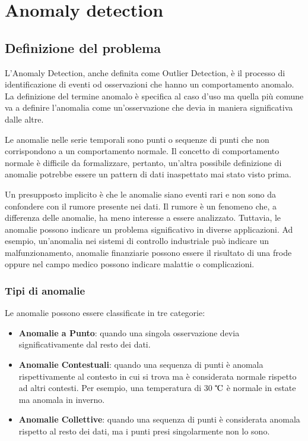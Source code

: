 \chapter{Anomaly detection}
\label{chap:intro}

\section{Definizione del problema}

L'Anomaly Detection, anche definita come Outlier Detection, è il processo di identificazione di eventi od osservazioni che hanno un comportamento anomalo. 
La definizione del termine anomalo è specifica al caso d'uso ma quella più comune va a definire l'anomalia come un'osservazione che devia in maniera significativa dalle altre.

Le anomalie nelle serie temporali sono punti o sequenze di punti che non corrispondono a un comportamento normale. Il concetto di comportamento normale è difficile da formalizzare, pertanto, un'altra possibile definizione di anomalie potrebbe essere un pattern di dati inaspettato mai stato visto prima.

Un presupposto implicito è che le anomalie siano eventi rari e non sono da confondere con il rumore presente nei dati. Il rumore è un fenomeno che, a differenza delle anomalie, ha meno interesse a essere analizzato.
Tuttavia, le anomalie possono indicare un problema significativo in diverse applicazioni. Ad esempio, un'anomalia nei sistemi di controllo industriale può indicare un malfunzionamento, anomalie finanziarie possono essere il risultato di una frode oppure nel campo medico possono indicare malattie o complicazioni.

\subsection{Tipi di anomalie}
Le anomalie possono essere classificate in tre categorie:
\begin{itemize}
	\item \textbf{Anomalie a Punto}: quando una singola osservazione devia significativamente dal resto dei dati.
	\item \textbf{Anomalie Contestuali}: quando una sequenza di punti è anomala rispettivamente al contesto in cui si trova ma è considerata normale rispetto ad altri contesti. Per esempio, una temperatura di 30 $\tccentigrade$ è normale in estate ma anomala in inverno. 
	\item \textbf{Anomalie Collettive}: quando una sequenza di punti è considerata anomala rispetto al resto dei dati, ma i punti presi singolarmente non lo sono.
\end{itemize}



